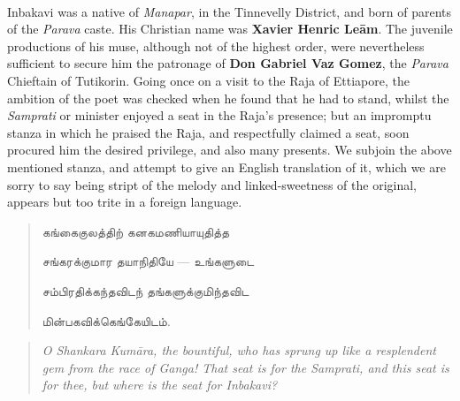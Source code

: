 \documentclass{article}
\newcommand{\TamilText}[1]{\texttamil{#1}}
\newcommand{\tam}[1]{\TamilText{#1}}
\begin{document}
\paragraph{}
Inbakavi was a native of \emph{Manapar}, in the Tinnevelly District, and born of parents of the \emph{Parava} caste. His Christian name was \textbf{Xavier Henric Le\={a}m}. The juvenile productions of his muse, although not of the highest order, were nevertheless sufficient to secure him the patronage of \textbf{Don Gabriel Vaz Gomez}, the \emph{Parava} Chieftain of Tutikorin. Going once on a visit to the Raja of Ettiapore, the ambition of the poet was checked when he found that he had to stand, whilst the \emph{Samprati} or minister enjoyed a seat in the Raja's presence; but an impromptu stanza in which he praised the Raja, and respectfully claimed a seat, soon procured him the desired privilege, and also many presents. We subjoin the above mentioned stanza, and attempt to give an English translation of it, which we are sorry to say being stript of the melody and linked-sweetness of the original, appears but too trite in a foreign language.
\begin{quotation}\small
\tam{கங்கைகுலத்திற்‌ கனகமணியாயுதித்த}

\tam{சங்‌கரக்குமார தயாநிதியே} --- \tam{உங்களுடை}

\tam{சம்பிரதிக்கந்தவிடந் தங்களுக்குமிந்தவிட}

\tam{மின்பகவிக்கெங்கேயிடம்‌}.
\end{quotation}
\begin{quotation}\small
\emph{O Shankara Kum\={a}ra, the bountiful, who has sprung up like a resplendent gem from the race of Ganga! That seat is for the Samprati, and this seat is for thee, but where is the seat for Inbakavi?}
\end{quotation}
\end{document}
